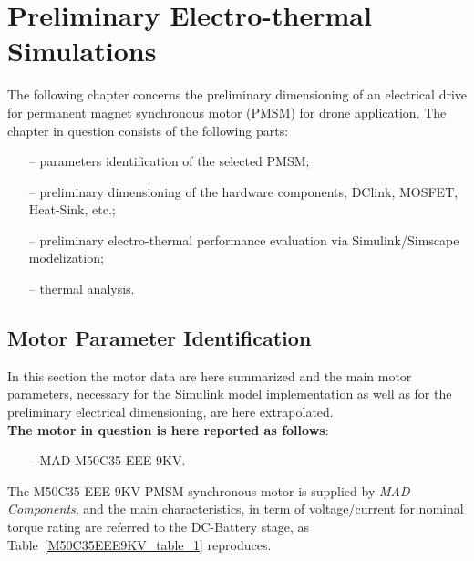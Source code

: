 \documentclass[11pt,a4paper,oneside]{book}
\title{\textbf{ 
	\begin{LARGE}
		Propeller Electrical Power-train Design
	\end{LARGE} \\[24pt]
	\begin{Large}
		Model, control strategy and hardware dimensioning 
	\end{Large}}
}
\author{\textbf{Davide Bagnara}}
\numberwithin{equation}{section}
\theoremstyle{it}
\theoremstyle{definition}
\begin{document}
	\thispagestyle{firstpage}
	\begin{mybox}
		\maketitle
		\vspace{120mm}
	\end{mybox}
	\newpage
	\tableofcontents
	\listoffigures	
	\listoftables
	\newpage
	

\chapter{Preliminary Electro-thermal Simulations}
The following chapter concerns the preliminary dimensioning of an electrical drive for permanent magnet synchronous motor (PMSM) for drone application. The chapter in question consists of the following parts:
\begin{itemize}
	\item[--] parameters identification of the selected PMSM;
	\item[--] preliminary dimensioning of the hardware components, DClink, MOSFET, Heat-Sink, etc.;
	\item[--] preliminary electro-thermal performance evaluation via Simulink/Simscape modelization;	
	\item[--] thermal analysis.
\end{itemize}

\section{Motor Parameter Identification}
In this section the motor data are here summarized and the main motor parameters, necessary for the Simulink model implementation as well as for the preliminary electrical dimensioning, are here extrapolated. \\

\noindent \textbf{The motor in question is here reported as follows}:
\begin{itemize}
	\item[--] MAD M50C35 EEE 9KV.
\end{itemize} 

The M50C35 EEE 9KV PMSM synchronous motor is supplied by \textit{MAD Components}, and the main characteristics, in term of voltage/current for nominal torque rating are referred to the DC-Battery stage, as Table~\ref{M50C35EEE9KV_table_1} reproduces.
\end{document}
